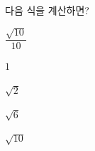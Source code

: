 다음 식을 계산하면?
\begin{choices32}{\rule[-3ex]{0pt}{8ex}$\dfrac{\sqrt{10}}{10}$}{\rule[-3ex]{0pt}{8ex}$1$}{\rule[-3ex]{0pt}{8ex}$\sqrt{2}$}{\rule[-3ex]{0pt}{8ex}$\sqrt{6}$}{\rule[-3ex]{0pt}{8ex}$\sqrt{10}$}\end{choices32}
